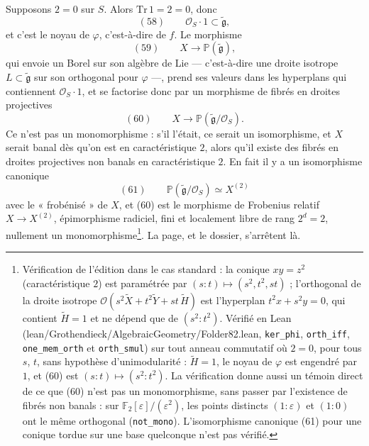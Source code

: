 \documentclass[11pt,a4paper]{article}
\begin{document}
Supposons $2 = 0$ sur $S$. Alors $\mathrm{Tr}\,1 = 2 = 0$, donc
\[
  (58) \qquad \mathcal{O}_S\cdot 1 \subset \widetilde{\mathfrak{g}} ,
\]
et c'est le noyau de $\varphi$, c'est-à-dire de $f$. Le morphisme
\[
  (59) \qquad X \longrightarrow \mathbb{P}(\widetilde{\mathfrak{g}}) ,
\]
qui envoie un Borel sur son algèbre de Lie — c'est-à-dire une droite isotrope
$L \subset \widetilde{\mathfrak{g}}$ sur son orthogonal pour $\varphi$ —, prend ses
valeurs dans les hyperplans qui contiennent $\mathcal{O}_S\cdot 1$, et se factorise donc
par un morphisme de fibrés en droites projectives
\[
  (60) \qquad X \longrightarrow \mathbb{P}(\widetilde{\mathfrak{g}}/\mathcal{O}_S) .
\]
Ce n'est pas un monomorphisme : s'il l'était, ce serait un isomorphisme, et $X$
serait banal dès qu'on est en caractéristique $2$, alors qu'il existe des fibrés
en droites projectives non banals en caractéristique $2$. En fait il y a un
isomorphisme canonique
\[
  (61) \qquad \mathbb{P}(\widetilde{\mathfrak{g}}/\mathcal{O}_S) \simeq X^{(2)}
\]
avec le « frobénisé » de $X$, et (60) est le morphisme de Frobenius relatif
$X \to X^{(2)}$, épimorphisme radiciel, fini et localement libre de rang
$2^d = 2$, nullement un monomorphisme\footnote{Vérification de l'édition dans le
cas standard : la conique $xy = z^2$ (caractéristique $2$) est paramétrée par
$(s : t) \mapsto (s^2, t^2, st)$ ; l'orthogonal de la droite isotrope
$\mathcal{O}(s^2\widetilde{X} + t^2\widetilde{Y} + st\,\widetilde{H})$ est l'hyperplan
$t^2 x + s^2 y = 0$, qui contient $\widetilde{H} = 1$ et ne dépend que de
$(s^2 : t^2)$. Vérifié en Lean (lean/Grothendieck/AlgebraicGeometry/Folder82.lean,
\texttt{ker\_phi}, \texttt{orth\_iff}, \texttt{one\_mem\_orth} et
\texttt{orth\_smul}) sur tout anneau commutatif où $2 = 0$, pour tous $s$,
$t$, sans hypothèse d'unimodularité : $\widetilde{H} = 1$, le noyau de
$\varphi$ est engendré par $1$, et (60) est $(s : t) \mapsto (s^2 : t^2)$. La
vérification donne aussi un témoin direct de ce que (60) n'est pas un
monomorphisme, sans passer par l'existence de fibrés non banals : sur
$\mathbb{F}_2[\varepsilon]/(\varepsilon^2)$, les points distincts
$(1 : \varepsilon)$ et $(1 : 0)$ ont le même orthogonal
(\texttt{not\_mono}). L'isomorphisme canonique (61) pour une conique tordue
sur une base quelconque n'est pas vérifié.}. La page, et le dossier, s'arrêtent là.
\end{document}
